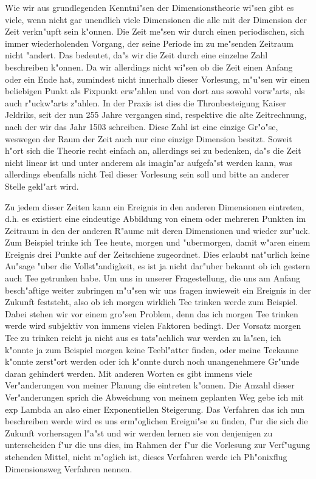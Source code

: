 \documentclass[a5paper,8pt]{book}
\begin{document}
Wie wir aus grundlegenden Kenntni"sen der Dimensionstheorie wi"sen gibt es viele, wenn nicht gar unendlich viele Dimensionen die alle mit der Dimension der Zeit verkn"upft sein k"onnen. Die Zeit me"sen wir durch einen periodischen, sich immer wiederholenden Vorgang, der seine Periode im zu me"senden Zeitraum nicht "andert. Das bedeutet, da"s wir die Zeit durch eine einzelne Zahl beschreiben k"onnen. Da wir allerdings nicht wi"sen ob die Zeit einen Anfang oder ein Ende hat, zumindest nicht innerhalb dieser Vorlesung, m"u"sen wir einen beliebigen Punkt als Fixpunkt erw"ahlen und von dort aus sowohl vorw"arts, als auch r"uckw"arts z"ahlen. In der Praxis ist dies die Thronbesteigung Kaiser Jeldriks, seit der nun 255 Jahre vergangen sind, respektive die alte Zeitrechnung, nach der wir das Jahr 1503 schreiben. Diese Zahl ist eine einzige Gr"o"se, weswegen der Raum der Zeit auch nur eine einzige Dimension besitzt. Soweit h"ort sich die Theorie recht einfach an, allerdings sei zu bedenken, da"s die Zeit nicht linear 
ist und unter anderem als imagin"ar aufgefa"st werden kann, was allerdings ebenfalls nicht Teil dieser Vorlesung sein soll und bitte an anderer Stelle gekl"art wird.

Zu jedem dieser Zeiten kann ein Ereignis in den anderen Dimensionen eintreten, d.h. es existiert eine eindeutige Abbildung von einem oder mehreren Punkten im Zeitraum in den der anderen R"aume mit deren Dimensionen und wieder zur"uck. Zum Beispiel trinke ich Tee heute, morgen und "ubermorgen, damit w"aren einem Ereignis drei Punkte auf der Zeitschiene zugeordnet. Dies erlaubt nat"urlich keine Au"sage "uber die Vollst"andigkeit, es ist ja nicht dar"uber bekannt ob ich gestern auch Tee getrunken habe.
Um uns in unserer Fragestellung, die uns am Anfang besch"aftige weiter zubringen m"u"sen wir uns fragen inwieweit ein Ereignis in der Zukunft feststeht, also ob ich morgen wirklich Tee trinken werde zum Beispiel. Dabei stehen wir vor einem gro"sen Problem, denn das ich morgen Tee trinken werde wird subjektiv von immens vielen Faktoren bedingt. Der Vorsatz morgen Tee zu trinken reicht ja nicht aus es tats"achlich war werden zu la"sen, ich k"onnte ja zum Beispiel morgen keine Teebl"atter finden, oder meine Teekanne k"onnte zerst"ort werden oder ich k"onnte durch noch unangenehmere Gr"unde daran gehindert werden.
Mit anderen Worten es gibt immens viele Ver"anderungen von meiner Planung die eintreten k"onnen. Die Anzahl dieser Ver"anderungen sprich die Abweichung von meinem geplanten Weg gebe ich mit exp Lambda an also einer Exponentiellen Steigerung.
Das Verfahren das ich nun beschreiben werde wird es uns erm"oglichen Ereigni"se zu finden, f"ur die sich die Zukunft vorhersagen l"a"st und wir werden lernen sie von denjenigen zu unterscheiden f"ur die uns dies, im Rahmen der f"ur die Vorlesung zur Verf"ugung stehenden Mittel, nicht m"oglich ist, dieses Verfahren werde ich Ph"onixflug Dimensionsweg Verfahren nennen.
\end{document}
